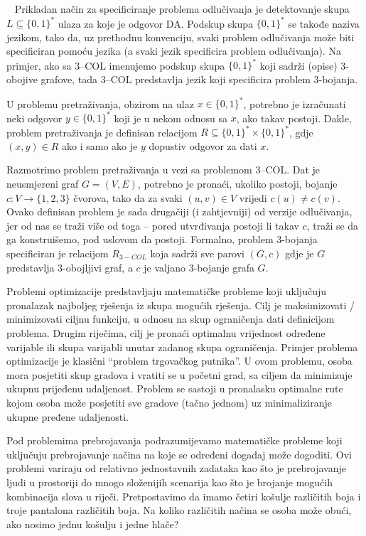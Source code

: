 ~ Prikladan način za specificiranje problema odlučivanja je detektovanje skupa $L \subseteq \{0, 1\}^*$ ulaza za koje je odgovor DA. Podskup skupa $\{0, 1\}^*$ se takođe naziva jezikom, tako da, uz prethodnu konvenciju, svaki problem odlučivanja može biti specificiran pomoću jezika (a svaki jezik specificira problem odlučivanja). Na primjer, ako sa   3--COL imenujemo podskup skupa $\{0, 1\}^*$ koji sadrži (opise) 3-obojive grafove, tada 3--COL predstavlja jezik koji specificira problem 3-bojanja. %

U problemu pretraživanja, obzirom na ulaz $x \in \{0, 1\}^*$, potrebno je izračunati neki odgovor
$y \in  \{0, 1\}^*$ koji je u nekom odnosu sa $x$, ako takav  postoji. Dakle, problem pretraživanja je
definisan relacijom $R \subseteq \{0, 1\}^* \times \{0, 1\}^*$, gdje $(x, y) \in R$ ako i samo ako je $y$ dopustiv odgovor  za dati $x$. 

Razmotrimo problem pretraživanja  u vezi sa problemom 3--COL. Dat je
neusmjereni graf $G = (V, E)$, potrebno je pronaći, ukoliko postoji, bojanje $c \colon V \rightarrow \{1, 2, 3\}$
čvorova, tako da za svaki $(u, v) \in V$ vrijedi $c(u) \neq c(v)$. Ovako definisan problem je sada drugačiji (i zahtjevniji) od verzije odlučivanja, jer  od nas se traži  više od toga  --  pored
utvrđivanja postoji li takav $c$, traži se da ga konstruišemo, pod uslovom da postoji.
Formalno, problem 3-bojanja specificiran je relacijom $R_{3-COL}$ koja sadrži sve
parovi $(G, c)$ gdje je $G$ predstavlja 3-obojljivi graf, a $c$ je valjano 3-bojanje grafa $G$.

Problemi optimizacije predstavljaju matematičke probleme koji uključuju pronalazak najboljeg rješenja iz skupa mogućih rješenja. Cilj je maksimizovati / minimizovati   ciljnu funkciju, u odnosu na skup  ograničenja dati definicijom problema. Drugim riječima, cilj je pronaći optimalnu vrijednost određene varijable ili skupa varijabli unutar zadanog skupa ograničenja. Primjer problema optimizacije je klasični ``problem trgovačkog putnika''. U ovom problemu, osoba mora posjetiti skup gradova i vratiti se u   početni grad, sa ciljem da minimizuje ukupnu prijeđenu udaljenost. Problem se sastoji u pronalasku optimalne rute kojom osoba može posjetiti sve gradove (tačno jednom) uz minimaliziranje ukupne pređene udaljenosti.

Pod problemima prebrojavanja podrazumijevamo matematičke probleme koji uključuju prebrojavanje načina na koje se određeni događaj može dogoditi. Ovi problemi variraju od relativno jednostavnih zadataka kao što je prebrojavanje ljudi u prostoriji do mnogo složenijih scenarija kao što je brojanje   mogućih kombinacija slova u riječi. Pretpostavimo da imamo četiri košulje različitih boja i troje pantalona različitih boja. Na koliko različitih načina se osoba može obući, ako nosimo jednu košulju i jedne hlače?

